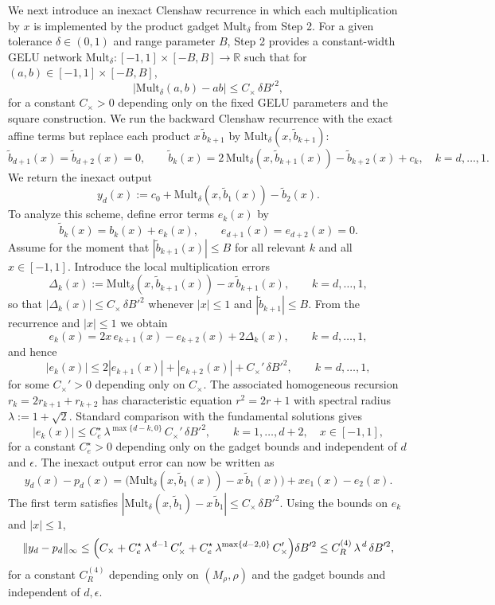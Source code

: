\documentclass{article}
\theoremstyle{plain}
\theoremstyle{definition}
\theoremstyle{remark}
\begin{document}
We next introduce an inexact Clenshaw recurrence in which each multiplication by $x$ is implemented by the product gadget $\mathrm{Mult}_\delta$ from Step 2. For a given tolerance $\delta\in(0,1)$ and range parameter $B$, Step 2 provides a constant-width GELU network \(\mathrm{Mult}_\delta:[-1,1]\times[-B,B]\to\mathbb{R} \) such that for $(a,b)\in[-1,1]\times[-B,B]$,
\[
|\mathrm{Mult}_\delta(a,b)-ab|\le C_\times\,\delta B'^2,
\]
for a constant $C_\times>0$ depending only on the fixed GELU parameters and the square construction. We run the backward Clenshaw recurrence with the exact affine terms but replace each product $x\,\tilde b_{k+1}$ by $\mathrm{Mult}_\delta(x,\tilde b_{k+1})$:
\[
\tilde b_{d+1}(x)=\tilde b_{d+2}(x)=0,\qquad
\tilde b_k(x)=2\,\mathrm{Mult}_\delta(x,\tilde b_{k+1}(x))-\tilde b_{k+2}(x)+c_k,\quad k=d,\dots,1.
\]
We return the inexact output
\[
y_d(x):=c_0+\mathrm{Mult}_\delta(x,\tilde b_1(x))-\tilde b_2(x).
\]
To analyze this scheme, define error terms $e_k(x)$ by
\[
\tilde b_k(x)=b_k(x)+e_k(x),\qquad e_{d+1}(x)=e_{d+2}(x)=0.
\]
Assume for the moment that $|\tilde b_{k+1}(x)|\le B$ for all relevant $k$ and all $x\in[-1,1]$. Introduce the local multiplication errors
\[
\Delta_k(x):=\mathrm{Mult}_\delta(x,\tilde b_{k+1}(x))-x\,\tilde b_{k+1}(x),
\qquad k=d,\dots,1,
\]
so that $|\Delta_k(x)|\le C_\times\,\delta B'^2$ whenever $|x|\le 1$ and $|\tilde b_{k+1}|\le B$. From the recurrence and $|x|\le 1$ we obtain
\[
e_k(x)=2x\,e_{k+1}(x)-e_{k+2}(x)+2\Delta_k(x),
\qquad k=d,\dots,1,
\]
and hence
\[
|e_k(x)|\le 2|e_{k+1}(x)|+|e_{k+2}(x)|+C_\times'\,\delta B'^2,\qquad k=d,\dots,1,
\]
for some $C_\times'>0$ depending only on $C_\times$. The associated homogeneous recursion $r_k=2r_{k+1}+r_{k+2}$ has characteristic equation $r^2=2r+1$ with spectral radius \(\lambda:=1+\sqrt{2}\). Standard comparison with the fundamental solutions gives
\[
|e_k(x)|\le C_e^\star\,\lambda^{\max\{d-k,0\}}\,C_\times'\,\delta B'^2,
\qquad k=1,\dots,d+2,\quad x\in[-1,1],
\]
for a constant $C_e^\star>0$ depending only on the gadget bounds and independent of $d$ and $\epsilon$. The inexact output error can now be written as
\[
y_d(x)-p_d(x)
=
\bigl(\mathrm{Mult}_\delta(x,\tilde b_1(x))-x\,\tilde b_1(x)\bigr)
+
x e_1(x)-e_2(x).
\]
The first term satisfies $|\mathrm{Mult}_\delta(x,\tilde b_1)-x\,\tilde b_1|\le C_\times\,\delta B'^2$. Using the bounds on $e_k$ and $|x|\le 1$,
\[
\|y_d-p_d\|_\infty
\le
\Bigl(C_\times
+
C_e^\star\,\lambda^{\,d-1}\,C_\times'
+
C_e^\star\,\lambda^{\max\{d-2,0\}}\,C_\times'
\Bigr)\delta B'^2
\le
C_R^{(4)}\,\lambda^{\,d}\,\delta B'^2,
\]
for a constant $C_R^{(4)}$ depending only on $(M_\rho,\rho)$ and the gadget bounds and independent of $d,\epsilon$.
\end{document}
